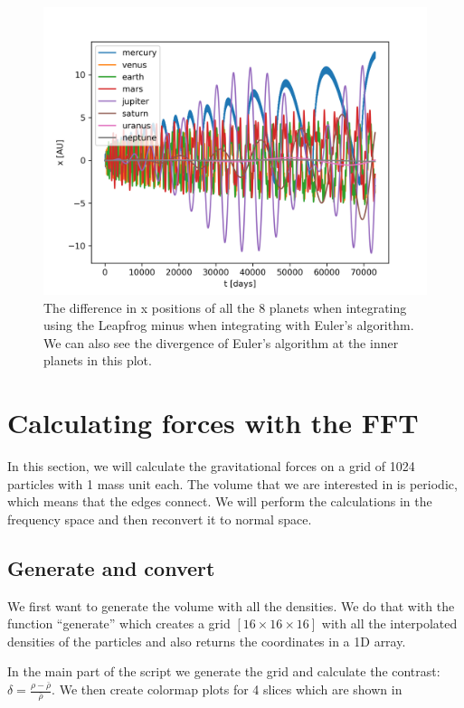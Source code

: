 \documentclass[a4paper,10pt]{article}
\begin{document}
\begin{figure}[H]
  \centering
  \includegraphics[width=.8\linewidth]{./plots/x-leapfrog-euler.png}
  \caption{The difference in x positions of all the 8 planets when integrating using the Leapfrog minus when integrating with Euler's algorithm. We can also see the divergence of Euler's algorithm at the inner planets in this plot.}
  \label{fig:x-leap-eul}
\end{figure}


\section{Calculating forces with the FFT}

In this section, we will calculate the gravitational forces on a grid of 1024 particles with 1 mass unit each. The volume that we are interested in is periodic, which means that the edges connect. We will perform the calculations in the frequency space and then reconvert it to normal space.

\subsection{Generate and convert}
\label{sec:gen}

We first want to generate the volume with all the densities. We do that with the function ``generate'' which creates a grid $[16 \times 16 \times 16]$ with all the interpolated densities of the particles and also returns the coordinates in a 1D array. 



In the main part of the script we generate the grid and calculate the contrast: $\delta = \frac{\rho-\bar{\rho}}{\bar{\rho}}$. We then create colormap plots for 4 slices which are shown in 
\end{document}
